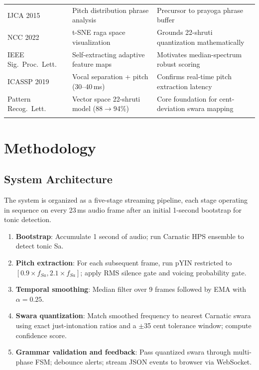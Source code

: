 \documentclass[12pt,a4paper]{report}
\numberwithin{equation}{chapter}
\begin{document}
\begin{table}[htbp]
\begin{tabular}{>{\raggedright\arraybackslash}p{3.2cm}
                >{\raggedright\arraybackslash}p{3.6cm}
                >{\raggedright\arraybackslash}p{6.4cm}}
\rowcolor{tablerowA}
\cite{ijca2015phrase} IJCA 2015 & Pitch distribution phrase analysis & Precursor to prayoga phrase buffer \\
\rowcolor{tablerowB}
\cite{ncc2022raga} NCC 2022 & t-SNE raga space visualization & Grounds 22-shruti quantization mathematically \\
\rowcolor{tablerowA}
\cite{ieee2021self} IEEE Sig.\ Proc.\ Lett. & Self-extracting adaptive feature maps & Motivates median-spectrum robust scoring \\
\rowcolor{tablerowB}
\cite{icassp2019singing} ICASSP 2019 & Vocal separation + pitch (30--40\,ms) & Confirms real-time pitch extraction latency \\
\rowcolor{tablerowA}
\cite{prl2021vector} Pattern Recog.\ Lett. & Vector space 22-shruti model (88$\to$94\%) & Core foundation for cent-deviation swara mapping \\
\arrayrulecolor{tableheadbg}
\bottomrule
\end{tabular}
\end{table}

\chapter{Methodology}
\section{System Architecture}
The system is organized as a five-stage streaming pipeline, each stage operating in sequence on every 23\,ms audio frame after an initial 1-second bootstrap for tonic detection.

\begin{enumerate}
    \item \textbf{Bootstrap}: Accumulate 1 second of audio; run Carnatic HPS ensemble to detect tonic Sa.
    \item \textbf{Pitch extraction}: For each subsequent frame, run pYIN restricted to $[0.9 \times f_{Sa}, 2.1 \times f_{Sa}]$; apply RMS silence gate and voicing probability gate.
    \item \textbf{Temporal smoothing}: Median filter over 9 frames followed by EMA with $\alpha = 0.25$.
    \item \textbf{Swara quantization}: Match smoothed frequency to nearest Carnatic swara using exact just-intonation ratios and a $\pm$35 cent tolerance window; compute confidence score.
    \item \textbf{Grammar validation and feedback}: Pass quantized swara through multi-phase FSM; debounce alerts; stream JSON events to browser via WebSocket.
\end{enumerate}
\end{document}
